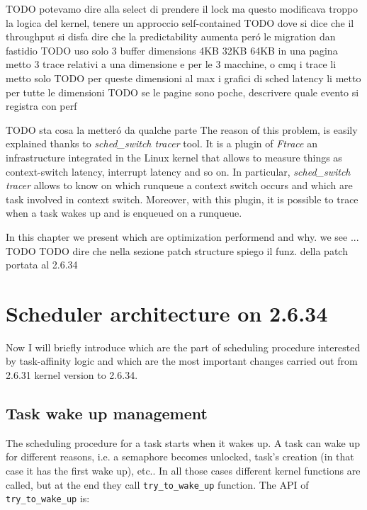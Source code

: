 TODO potevamo dire alla select di prendere il lock ma questo modificava troppo la logica del kernel, tenere un approccio self-contained
TODO dove si dice che il throughput si disfa dire che la predictability aumenta per\'o le migration dan fastidio
TODO uso solo 3 buffer dimensions 4KB 32KB 64KB in una pagina metto 3 trace relativi a una dimensione e per le 3 macchine, o cmq i trace li metto solo
TODO per queste dimensioni al max i grafici di sched latency li metto per tutte le dimensioni
TODO se le pagine sono poche, descrivere quale evento si registra con perf




TODO sta cosa la metter\'o da qualche parte
The reason of this problem, is easily explained thanks to \textit{sched\_switch tracer} tool. It is a plugin of \textit{Ftrace} an infrastructure integrated
in the Linux kernel that allows to measure things as context-switch latency, interrupt latency and so on. In particular, \textit{sched\_switch tracer} 
allows to know on which runqueue a context switch occurs and which are task involved in context switch. Moreover, with this plugin, it is possible to 
trace when a task wakes up and is enqueued on a runqueue.





In this chapter we present which are optimization performend and why. we see ... TODO 
TODO dire che nella sezione patch structure spiego il funz. della patch portata al 2.6.34

\section{Scheduler architecture on 2.6.34}

Now I will briefly introduce which are the part of scheduling procedure 
interested by task-affinity logic and which are the most important changes 
carried out from 2.6.31 kernel version to 2.6.34.

\subsection{Task wake up management}

The scheduling procedure for a task starts when it wakes up. A task can wake up
for different reasons, i.e. a semaphore becomes unlocked, task's creation
(in that case it has the first wake up), etc.. In all those cases different
kernel functions are called, but at the end they call 
\texttt{try\_to\_wake\_up} function. The API of \texttt{try\_to\_wake\_up} is:

